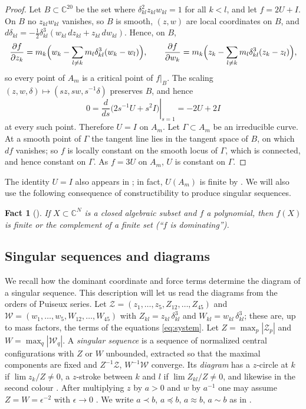 \documentclass[Threeside,11pt]{article}
\newtheorem{fact}{Fact}
\theoremstyle{definition}
\theoremstyle{remark}
\numberwithin{equation}{section}
\newcommand{\C}{\mathbb C}\newcommand{\T}{\mathbb T}
\theoremstyle{remark}
\begin{document}
\begin{proof}
Let $B\subset\C^{20}$ be the set where $\delta_{kl}^2z_{kl}w_{kl}=1$ for all $k<l$, and let
$f=2U+I$.  On $B$ no $z_{kl}w_{kl}$ vanishes, so $B$ is smooth, $(z,w)$ are local coordinates
on $B$, and $d\delta_{kl}=-\frac12\delta_{kl}^3(w_{kl}\,dz_{kl}+z_{kl}\,dw_{kl})$.  Hence, on
$B$,
\[
  \frac{\partial f}{\partial z_k}=m_k\Bigl(w_k-\sum_{l\ne k}m_l\delta_{kl}^3(w_k-w_l)\Bigr),\qquad
  \frac{\partial f}{\partial w_k}=m_k\Bigl(z_k-\sum_{l\ne k}m_l\delta_{kl}^3(z_k-z_l)\Bigr),
\]
so every point of $A_m$ is a critical point of $f|_B$.  The scaling
$(z,w,\delta)\mapsto(sz,sw,s^{-1}\delta)$ preserves $B$, and hence
\[
 0=\left.\frac{d}{ds}\bigl(2s^{-1}U+s^2I\bigr)\right|_{s=1}
 =-2U+2I
\]
at every such point.  Therefore $U=I$ on $A_m$.  Let $\Gamma\subset A_m$ be an irreducible curve.  At a smooth point of
$\Gamma$ the tangent line lies in the tangent space of $B$, on which $df$ vanishes; so $f$ is
locally constant on the smooth locus of $\Gamma$, which is connected, and hence constant on
$\Gamma$.  As $f=3U$ on $A_m$, $U$ is constant on $\Gamma$.
\end{proof}
The identity $U=I$ also appears in \cite[p.~541]{AK}; in fact,
$U(A_m)$ is finite by \cite[Lemma~2]{AK}.  We will also use the following consequence of
constructibility to produce singular sequences.

\begin{fact}[{\cite[Lemma~1]{AK}}]\label{fact:lemma1}
If $X\subset\C^N$ is a closed algebraic subset and $f$ a polynomial, then $f(X)$ is finite or
the complement of a finite set (``$f$ is dominating'').
\end{fact}

\subsection{Singular sequences and diagrams}
We recall how the dominant coordinate and force terms determine the diagram of a singular
sequence.  This description will let us read the diagrams from the orders of Puiseux series.
Let $\mathcal Z=(z_1,\dots,z_5,Z_{12},\dots,Z_{45})$ and $\mathcal W=(w_1,\dots,w_5,W_{12},
\dots,W_{45})$ with $Z_{kl}=z_{kl}\,\delta_{kl}^3$ and $W_{kl}=w_{kl}\,\delta_{kl}^3$; these are,
up to mass factors, the terms of the equations \eqref{eq:system}.  Let $Z=\max_p|\mathcal Z_p|$
and $W=\max_q|\mathcal W_q|$.  A \emph{singular sequence} \cite[Def.~3]{AK} is a sequence of
normalized central configurations with $Z$ or $W$ unbounded, extracted so that the maximal
components are fixed and $Z^{-1}\mathcal Z$, $W^{-1}\mathcal W$ converge.  Its \emph{diagram}
has a $z$-circle at $k$ if $\lim z_k/Z\ne0$, a $z$-stroke between $k$ and $l$ if
$\lim Z_{kl}/Z\ne 0$, and likewise in the second colour \cite[\S3]{AK}.  After multiplying $z$
by $a>0$ and $w$ by $a^{-1}$ one may assume $Z=W=\epsilon^{-2}$ with $\epsilon\to0$
\cite[p.~547]{AK}.  We write $a\prec b$, $a\preccurlyeq b$, $a\approx b$, $a\sim b$ as in
\cite[\S3]{AK}.
\end{document}
